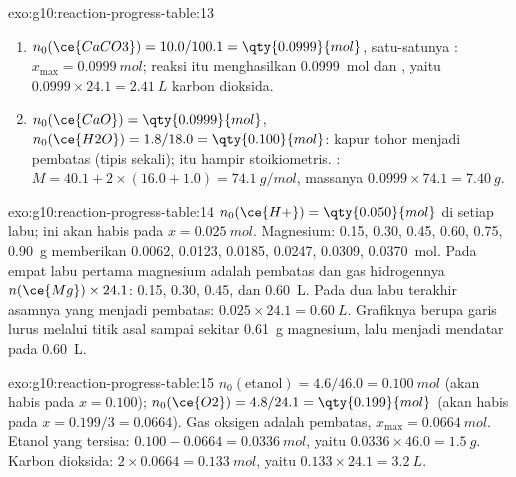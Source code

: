 \begin{solution}{exo:g10:reaction-progress-table:13}
\begin{enumerate}
  \item $n_0(\ce{CaCO3}) = 10.0 / 100.1 = \qty{0.0999}{mol}$, satu-satunya
        : $x_{\max} = \qty{0.0999}{mol}$; reaksi itu menghasilkan
        \qty{0.0999}{mol}  dan , yaitu
        $0.0999 \times 24.1 = \qty{2.41}{L}$ karbon dioksida.
  \item $n_0(\ce{CaO}) = \qty{0.0999}{mol}$, $n_0(\ce{H2O}) = 1.8 / 18.0
        = \qty{0.100}{mol}$: kapur tohor menjadi pembatas (tipis sekali);
         itu hampir stoikiometris. :
        $M = 40.1 + 2 \times (16.0 + 1.0) = \qty{74.1}{g/mol}$, massanya
        $0.0999 \times 74.1 = \qty{7.40}{g}$.
\end{enumerate}
\end{solution}

\begin{solution}{exo:g10:reaction-progress-table:14}
$n_0(\ce{H+}) = \qty{0.050}{mol}$ di setiap labu;  ini akan habis
pada $x = \qty{0.025}{mol}$. Magnesium: 0.15, 0.30, 0.45, 0.60, 0.75,
\qty{0.90}{g} memberikan 0.0062, 0.0123, 0.0185, 0.0247, 0.0309,
\qty{0.0370}{mol}. Pada empat labu pertama magnesium adalah pembatas
dan gas hidrogennya $n(\ce{Mg}) \times 24.1$: 0.15, 0.30, 0.45, dan
\qty{0.60}{L}. Pada dua labu terakhir asamnya yang menjadi pembatas:
$0.025 \times 24.1
= \qty{0.60}{L}$. Grafiknya berupa garis lurus melalui titik asal
sampai sekitar \qty{0.61}{g} magnesium, lalu menjadi mendatar pada
\qty{0.60}{L}.
\end{solution}

\begin{solution}{exo:g10:reaction-progress-table:15}
$n_0(\text{etanol}) = 4.6 / 46.0 = \qty{0.100}{mol}$ (akan habis pada
$x = 0.100$); $n_0(\ce{O2}) = 4.8 / 24.1 = \qty{0.199}{mol}$ (akan habis
pada $x = 0.199/3 = 0.0664$). Gas oksigen adalah pembatas,
$x_{\max} = \qty{0.0664}{mol}$. Etanol yang tersisa: $0.100 - 0.0664 =
\qty{0.0336}{mol}$, yaitu $0.0336 \times 46.0 = \qty{1.5}{g}$. Karbon
dioksida: $2 \times 0.0664 = \qty{0.133}{mol}$, yaitu
$0.133 \times 24.1 = \qty{3.2}{L}$.
\end{solution}


